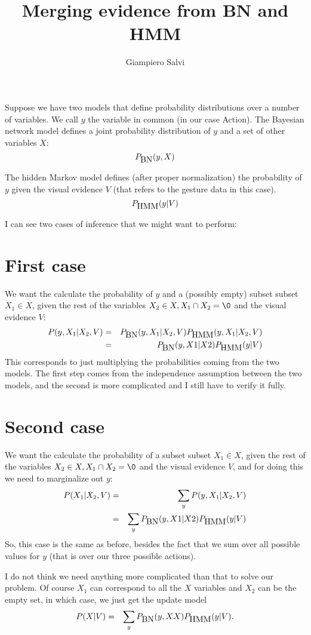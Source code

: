 \documentclass{article}
\title{Merging evidence from BN and HMM}
\author{Giampiero Salvi}
\begin{document}
\maketitle

\newcommand{\pbn}{\ensuremath P_{\mbox{BN}}}
\newcommand{\phmm}{\ensuremath P_{\mbox{HMM}}}

Suppose we have two models that define probability distributions over a number of variables.
We call $y$ the variable in common (in our case Action).
The Bayesian network model defines a joint probability distribution of $y$ and a set of other variables $X$:
\begin{equation}
\pbn(y,X)
\end{equation}

The hidden Markov model defines (after proper normalization) the probability of $y$ given the visual evidence $V$ (that refers to the gesture data in this case).
\begin{equation}
\phmm(y|V)
\end{equation}

I can see two cases of inference that we might want to perform:
\section{First case}
We want the calculate the probability of $y$ and a (possibly empty) subset subset $X_1 \in X$, given the rest of the variables $X_2\in X, X_1 \cap X_2 = \0$ and the visual evidence $V$:
\begin{eqnarray}
P(y, X_1|X_2, V) &=& \pbn(y, X_1|X_2,V)\phmm(y,X_1|X_2,V) \\
&=& \pbn(y,X1|X2)\phmm(y|V)
\end{eqnarray}
This corresponds to just multiplying the probabilities coming from the two models.
The first step comes from the independence assumption between the two models, and the second is more complicated and I still have to verify it fully.

\section{Second case}
We want the calculate the probability of a subset subset $X_1 \in X$, given the rest of the variables $X_2\in X, X_1 \cap X_2 = \0$ and the visual evidence $V$, and for doing this we need to marginalize out $y$:
\begin{eqnarray}
P(X_1|X_2, V) &=& \sum_y P(y, X_1|X_2, V) \\
&=& \sum_y \pbn(y,X1|X2)\phmm(y|V)
\end{eqnarray}
So, this case is the same as before, besides the fact that we sum over all possible values for $y$ (that is over our three possible actions).

I do not think we need anything more complicated than that to solve our problem.
Of course $X_1$ can correspond to all the $X$ variables and $X_2$ can be the empty set, in which case, we just get the update model
\begin{eqnarray}
P(X| V) &=& \sum_y \pbn(y,XX)\phmm(y|V).
\end{eqnarray}
\end{document}
